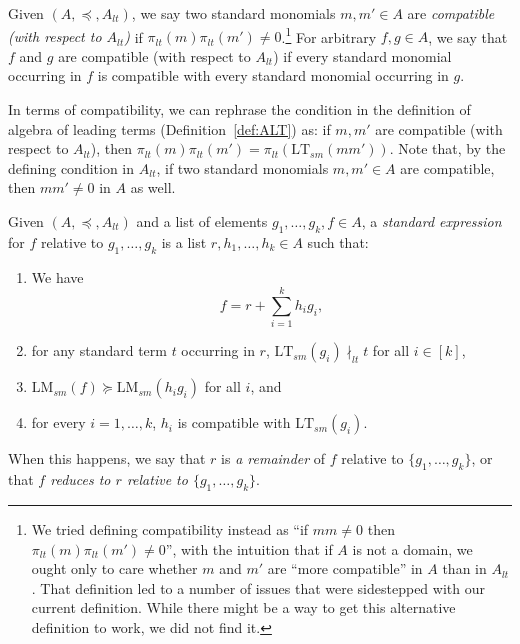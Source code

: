 \documentclass[11pt,reqno]{amsart}
\newcommand{\lmsm}{\text{LM}_{sm}}
\newcommand{\ltsm}{\text{LT}_{sm}}
\theoremstyle{definition}
\numberwithin{equation}{section}
\begin{document}
\begin{definition}[store=defncompatible, note=Compatible] \label{def:compatible}
Given $(A,\preceq,A_{lt})$, we say two standard monomials $m,m' \in A$ are \emph{compatible (with respect to $A_{lt}$)}  if $\pi_{lt}(m) \pi_{lt}(m') \neq 0$.\footnote{We tried defining compatibility instead as ``if $mm \neq 0$ then $\pi_{lt}(m) \pi_{lt}(m') \neq 0$'', with the intuition that if $A$ is not a domain, we ought only to care whether $m$ and $m'$ are ``more compatible'' in $A$ than in $A_{lt}$. That definition led to a number of issues that were sidestepped with our current definition. While there might be a way to get this alternative definition to work, we did not find it.} For arbitrary $f,g \in A$, we say that $f$ and $g$ are compatible (with respect to $A_{lt}$) if every standard monomial occurring in $f$ is compatible with every standard monomial occurring in $g$.
\end{definition}

In terms of compatibility, we can rephrase the condition in the definition of algebra of leading terms (Definition~\ref{def:ALT}) as: if $m,m'$ are compatible (with respect to $A_{lt}$), then $\pi_{lt}(m)\pi_{lt}(m') = \pi_{lt}(\ltsm(mm'))$. Note that, by the defining condition in $A_{lt}$, if two standard monomials $m,m' \in A$ are compatible, then $mm' \neq 0$ in $A$ as well.

\begin{definition}[store=defnstandardexpression,note=Standard expression]
\label{defn:standard-expression}
Given $(A, \preceq, A_{lt})$ and a list of elements $g_1,\dotsc,g_k, f \in A$, a \emph{standard expression} for $f$ relative to $g_1,\dotsc,g_k$ is a list $r,h_1,\dotsc,h_k \in A$ such that:
\begin{enumerate}
\item We have
\begin{equation} \label{eqn:standard-expression} f = r + \sum_{i=1}^{k} h_i g_i, \end{equation}

\item for any standard term $t$ occurring in $r$, $\ltsm(g_i) \nmid_{lt} t$ for all $i \in [k]$,
\item $\lmsm(f) \succeq \lmsm(h_i g_i)$ for all $i$, and
\item for every $i=1,\dotsc,k$, $h_i$ is compatible with $\ltsm(g_i)$.
\end{enumerate}

When this happens, we say that $r$ is \emph{a remainder} of $f$ relative to $\{g_1,\dotsc,g_k\}$, or that \emph{$f$ reduces to $r$ relative to $\{g_1, \ldots, g_k\}$}. 
\end{definition}
\end{document}
